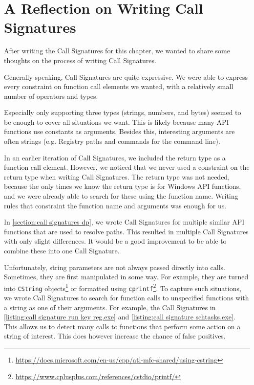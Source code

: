 \section{A Reflection on Writing Call Signatures}\label{section:reflection on writing call signatures}
After writing the Call Signatures for this chapter, we wanted to share some thoughts on the process of writing Call Signatures.

Generally speaking, Call Signatures are quite expressive. We were able to express every constraint on function call elements we wanted, with a relatively small number of operators and types.

Especially only supporting three types (strings, numbers, and bytes) seemed to be enough to cover all situations we want. This is likely because many API functions use constants as arguments. Besides this, interesting arguments are often strings (e.g. Registry paths and commands for the command line).

\medskip

In an earlier iteration of Call Signatures, we included the return type as a function call element. However, we noticed that we never used a constraint on the return type when writing Call Signatures. The return type was not needed, because the only times we know the return type is for Windows API functions, and we were already able to search for these using the function name. Writing rules that constraint the function name and arguments was enough for us.

\medskip

In \autoref{section:call signatures dp}, we wrote Call Signatures for multiple similar API functions that are used to resolve paths. This resulted in multiple Call Signatures with only slight differences. It would be a good improvement to be able to combine these into one Call Signature.

\medskip

Unfortunately, string parameters are not always passed directly into calls. Sometimes, they are first manipulated in some way. For example, they are turned into \texttt{CString} objects\footnote{\tiny \url{https://docs.microsoft.com/en-us/cpp/atl-mfc-shared/using-cstring}} or formatted using \texttt{cprintf}\footnote{\tiny \url{https://www.cplusplus.com/references/cstdio/printf/}}. To capture such situations, we wrote Call Signatures to search for function calls to unspecified functions with a string as one of their arguments. For example, the Call Signatures in \autoref{listing:call signature run key reg.exe} and \autoref{listing:call signature schtasks.exe}. This allows us to detect many calls to functions that perform some action on a string of interest. This does however increase the chance of false positives.
